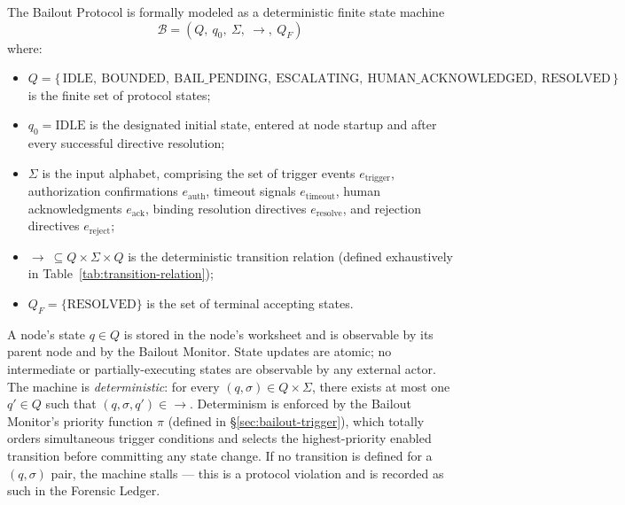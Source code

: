 The Bailout Protocol is formally modeled as a deterministic finite state machine
\[
\mathcal{B} = (Q,\ q_0,\ \Sigma,\ \rightarrow,\ Q_F)
\]
where:

\begin{itemize}\itemsep0em
\item $Q = \{\,\text{IDLE},\ \text{BOUNDED},\ \text{BAIL\_PENDING},\ \text{ESCALATING},\ \text{HUMAN\_ACKNOWLEDGED},\ \text{RESOLVED}\,\}$ is the finite set of protocol states;
\item $q_0 = \text{IDLE}$ is the designated initial state, entered at node startup and after every successful directive resolution;
\item $\Sigma$ is the input alphabet, comprising the set of trigger events $e_{\text{trigger}}$, authorization confirmations $e_{\text{auth}}$, timeout signals $e_{\text{timeout}}$, human acknowledgments $e_{\text{ack}}$, binding resolution directives $e_{\text{resolve}}$, and rejection directives $e_{\text{reject}}$;
\item $\rightarrow\ \subseteq Q \times \Sigma \times Q$ is the deterministic transition relation (defined exhaustively in Table~\ref{tab:transition-relation});
\item $Q_F = \{\text{RESOLVED}\}$ is the set of terminal accepting states.
\end{itemize}

A node's state $q \in Q$ is stored in the node's worksheet and is observable by its parent node and by the Bailout Monitor. State updates are atomic; no intermediate or partially-executing states are observable by any external actor. The machine is \emph{deterministic}: for every $(q, \sigma) \in Q \times \Sigma$, there exists at most one $q' \in Q$ such that $(q, \sigma, q') \in \rightarrow$. Determinism is enforced by the Bailout Monitor's priority function $\pi$ (defined in \S\ref{sec:bailout-trigger}), which totally orders simultaneous trigger conditions and selects the highest-priority enabled transition before committing any state change. If no transition is defined for a $(q, \sigma)$ pair, the machine stalls — this is a protocol violation and is recorded as such in the Forensic Ledger.

